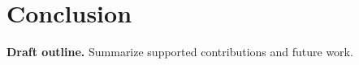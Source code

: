 \chapter{Conclusion}
\label{chap:conclusion}

\textbf{Draft outline.} Summarize supported contributions and future work.
